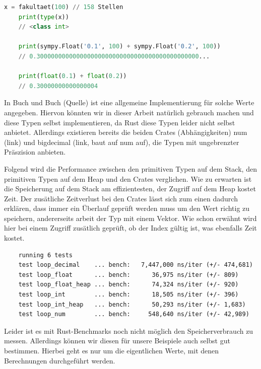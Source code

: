 \documentclass[11pt,a4paper, ngerman]{article}
\begin{document}
\begin{lstlisting}[language=Python, caption={SymPy Precision}]
    x = fakultaet(100) // 158 Stellen
    print(type(x))
    // <class int>

    print(sympy.Float('0.1', 100) + sympy.Float('0.2', 100))
    // 0.300000000000000000000000000000000000000000000...

    print(float(0.1) + float(0.2))
    // 0.30000000000000004
\end{lstlisting}

In Buch und Buch (Quelle) ist eine allgemeine Implementierung für solche Werte angegeben. Hiervon könnten wir in dieser Arbeit natürlich gebrauch machen und diese Typen selbst implementieren, da Rust diese Typen leider nicht selbst anbietet. Allerdings existieren bereits die beiden Crates (Abhängigkeiten) num (link) und bigdecimal (link, baut auf num auf), die Typen mit ungebrenzter Präszision anbieten.

Folgend wird die Performance zwischen den primitiven Typen auf dem Stack, den primitiven Typen auf dem Heap und den Crates verglichen. Wie zu erwarten ist die Speicherung auf dem Stack am effizientesten, der Zugriff auf dem Heap kostet Zeit. Der zusätliche Zeitverlust bei den Crates lässt sich zum einen dadurch erklären, dass immer ein Überlauf geprüft werden muss um den Wert richtig zu speichern, andererseits arbeit der Typ  mit einem Vektor. Wie schon erwähnt wird hier bei einem Zugriff zusätlich geprüft, ob der Index gültig ist, was ebenfalls Zeit kostet.

\begin{verbatim}
    running 6 tests
    test loop_decimal    ... bench:   7,447,000 ns/iter (+/- 474,681)
    test loop_float      ... bench:      36,975 ns/iter (+/- 809)
    test loop_float_heap ... bench:      74,324 ns/iter (+/- 920)
    test loop_int        ... bench:      18,505 ns/iter (+/- 396)
    test loop_int_heap   ... bench:      50,293 ns/iter (+/- 1,683)
    test loop_num        ... bench:     548,640 ns/iter (+/- 42,989)
\end{verbatim}

Leider ist es mit Rust-Benchmarks noch nicht möglich den Speicherverbrauch zu messen. Allerdings können wir diesen für unsere Beispiele auch selbst gut bestimmen. Hierbei geht es nur um die eigentlichen Werte, mit denen Berechnungen durchgeführt werden.
\end{document}
